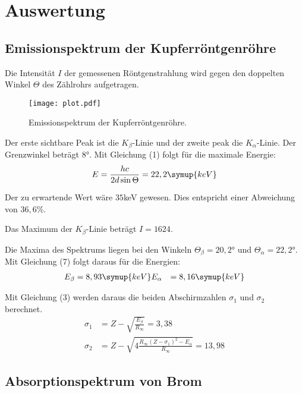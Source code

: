 \section{Auswertung}
\label{sec:Auswertung}

\subsection{Emissionspektrum der Kupferröntgenröhre}

Die Intensität $I$ der gemessenen Röntgenstrahlung wird gegen den doppelten Winkel $\Theta$ des Zählrohrs aufgetragen.

\begin{figure}
  \centering
  \texttt{[image: plot.pdf]}
  \caption{Emissionspektrum der Kupferröntgenröhre.}
  \label{fig:plot}
\end{figure}

Der erste sichtbare Peak ist die $K_{\beta}$-Linie und der zweite peak die $K_{\alpha}$-Linie.
Der Grenzwinkel beträgt $8$°.
Mit Gleichung (1) folgt für die maximale Energie:
\begin{equation}
  E = \frac{hc}{2d \sin{\Theta}} = 22,2 \symup{keV}
\end{equation}

Der zu erwartende Wert wäre $35$keV gewesen.
Dies entspricht einer Abweichung von $36,6 \%$.

Das Maximum der $K_{\beta}$-Linie beträgt $I=1624$.



Die Maxima des Spektrums liegen bei den Winkeln $\Theta_{\beta} = 20,2°$ und $\Theta_{\alpha} = 22,2°$.
Mit Gleichung (7) folgt daraus für die Energien:
\begin{align*}
  E_{\beta} &= 8,93 \symup{keV}
  E_{\alpha} &= 8,16 \symup{keV}
\end{align*}

Mit Gleichung (3) werden daraus die beiden Abschirmzahlen $\sigma_1$ und $\sigma_2$ berechnet.
\begin{align*}
  \sigma_1 &= Z - \sqrt{\frac{E_{\beta}}{R_{\infty}}} = 3,38 \\
  \sigma_2 &= Z - \sqrt{4 \frac{R_{\infty} (Z-\sigma_1)^2 - E_{\alpha}}{R_{\infty}}} = 13,98
\end{align*}


\subsection{Absorptionspektrum von Brom}

